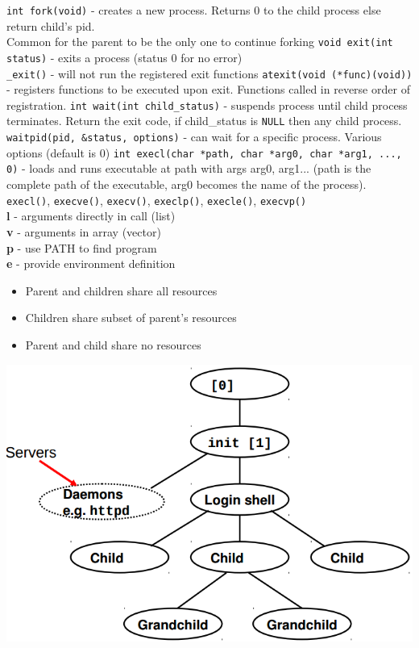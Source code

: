 \documentclass[number]{notes}
\begin{document}
\begin{landscape}
\begin{multicols}{3}
\texttt{int fork(void)} - creates a new process. Returns 0 to the child process else return child's pid.\\
Common for the parent to be the only one to continue forking
\texttt{void exit(int status)} - exits a process (status 0 for no error)\\
\texttt{\_exit()} - will not run the registered exit functions
\texttt{atexit(void (*func)(void))} - registers functions to be executed upon exit. Functions called in reverse order of registration.
\texttt{int wait(int\* child\_status)} - suspends process until child process terminates. Return the exit code, if child\_status is \texttt{NULL} then any child process.
\texttt{waitpid(pid, \&status, options)} - can wait for a specific process. Various options (default is 0)
\texttt{int execl(char *path, char *arg0, char *arg1, ..., 0)} - loads and runs executable at path with args arg0, arg1... (path is the complete path of the executable, arg0 becomes the name of the process).
\texttt{execl()}, \texttt{execve()}, \texttt{execv()}, \texttt{execlp()}, \texttt{execle()}, \texttt{execvp()}\\
\textbf{l} - arguments directly in call (list)\\
\textbf{v} - arguments in array (vector)\\
\textbf{p} - use PATH to find program\\
\textbf{e} - provide environment definition
\begin{itemize}
    \item Parent and children share all resources
    \item Children share subset of parent's resources
    \item Parent and child share no resources
\end{itemize}
\includegraphics[width=\linewidth]{processHierarchy.png}


\end{multicols}
\end{landscape}
\end{document}
